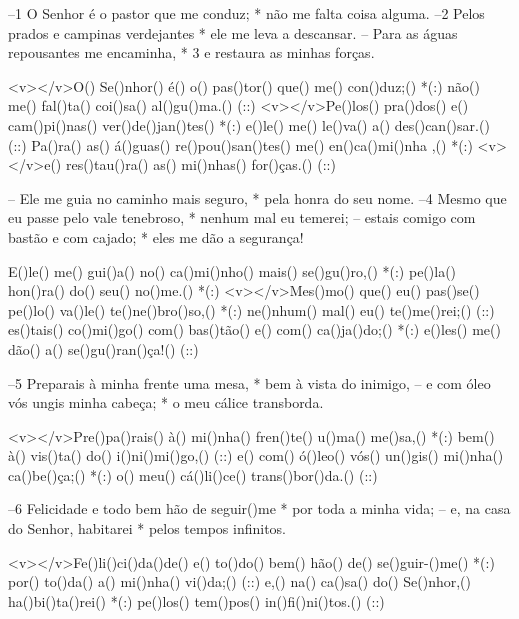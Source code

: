 –1 O Senhor é o pastor que me conduz; *
não me falta coisa alguma.
–2 Pelos prados e campinas verdejantes *
ele me leva a descansar.
– Para as águas repousantes me encaminha, *
3 e restaura as minhas forças.

<v></v>O() Se()nhor() é() o() pas()tor() que() me() con()duz;() *(:)
não() me() fal()ta() coi()sa() al()gu()ma.() (::)
<v></v>Pe()los() pra()dos() e() cam()pi()nas() ver()de()jan()tes() *(:)
e()le() me() le()va() a() des()can()sar.() (::)
Pa()ra() as() á()guas() re()pou()san()tes() me() en()ca()mi()nha
,() *(:)
<v></v>e() res()tau()ra() as() mi()nhas() for()ças.() (::)

– Ele me guia no caminho mais seguro, *
pela honra do seu nome.
–4 Mesmo que eu passe pelo vale tenebroso, *
nenhum mal eu temerei;
– estais comigo com bastão e com cajado; *
eles me dão a segurança!

E()le() me() gui()a() no() ca()mi()nho() mais() se()gu()ro,() *(:)
pe()la() hon()ra() do() seu() no()me.() *(:)
<v></v>Mes()mo() que() eu() pas()se() pe()lo() va()le() te()ne()bro()so,() *(:)
ne()nhum() mal() eu() te()me()rei;() (::)
es()tais() co()mi()go() com() bas()tão() e() com() ca()ja()do;() *(:)
e()les() me() dão() a() se()gu()ran()ça!() (::)

–5 Preparais à minha frente uma mesa, *
bem à vista do inimigo,
– e com óleo vós ungis minha cabeça; *
o meu cálice transborda.

<v></v>Pre()pa()rais() à() mi()nha() fren()te() u()ma() me()sa,() *(:)
bem() à() vis()ta() do() i()ni()mi()go,() (::)
e() com() ó()leo() vós() un()gis() mi()nha() ca()be()ça;() *(:)
o() meu() cá()li()ce() trans()bor()da.() (::)

–6 Felicidade e todo bem hão de seguir()me *
por toda a minha vida;
– e, na casa do Senhor, habitarei *
pelos tempos infinitos.

<v></v>Fe()li()ci()da()de() e() to()do() bem() hão() de() se()guir-()me() *(:)
por() to()da() a() mi()nha() vi()da;() (::)
e,() na() ca()sa() do() Se()nhor,() ha()bi()ta()rei() *(:)
pe()los() tem()pos() in()fi()ni()tos.() (::)